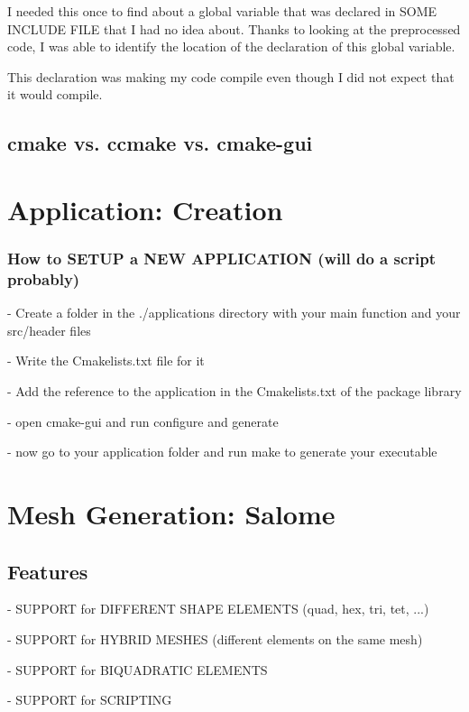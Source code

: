 \documentclass[10pt]{book}
\begin{document}
  I needed this once to find about a global variable that was declared in SOME INCLUDE FILE
  that I had no idea about. Thanks to looking at the preprocessed code, I was able to identify
  the location of the declaration of this global variable.
  
  This declaration was making my code compile even though I did not expect that it would compile.
  

\chapter{cmake vs. ccmake vs. cmake-gui}


\part{Application: Creation}
  
  
\section{How to SETUP a NEW APPLICATION (will do a script probably)}

- Create a folder in the ./applications directory with your main function and your src/header files

- Write the Cmakelists.txt file for it

- Add the reference to the application in the Cmakelists.txt of the package library

- open cmake-gui and run configure and generate


- now go to your application folder and run make to generate your executable


 
\part{Mesh Generation: Salome}


\chapter{Features}


 - {SUPPORT for DIFFERENT SHAPE ELEMENTS (quad, hex, tri, tet, ...)} 

 - {SUPPORT for HYBRID MESHES (different elements on the same mesh)}
    
 - {SUPPORT for BIQUADRATIC ELEMENTS}
    
 - {SUPPORT for SCRIPTING}
  
\end{document}
